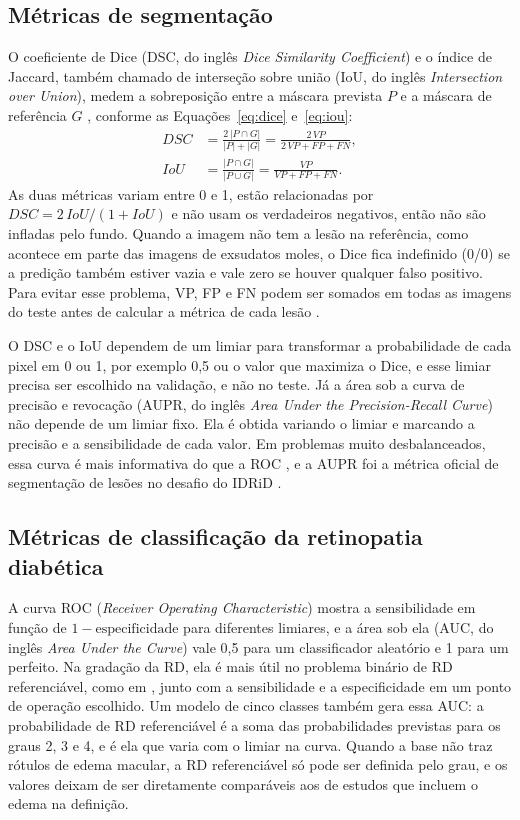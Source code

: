 \subsection{Métricas de segmentação}
\label{sec:ft-metricas-seg}

O coeficiente de Dice (DSC, do inglês \textit{Dice Similarity Coefficient}) e o índice de Jaccard, também chamado de interseção sobre união (IoU, do inglês \textit{Intersection over Union}), medem a sobreposição entre a máscara prevista $P$ e a máscara de referência $G$ \cite{taha2015metrics}, conforme as Equações~\ref{eq:dice} e~\ref{eq:iou}:
\begin{align}
	DSC &= \frac{2\,|P \cap G|}{|P| + |G|} = \frac{2\,VP}{2\,VP + FP + FN}, \label{eq:dice}\\
	IoU &= \frac{|P \cap G|}{|P \cup G|} = \frac{VP}{VP + FP + FN}. \label{eq:iou}
\end{align}
As duas métricas variam entre 0 e 1, estão relacionadas por $DSC = 2\,IoU/(1 + IoU)$ e não usam os verdadeiros negativos, então não são infladas pelo fundo. Quando a imagem não tem a lesão na referência, como acontece em parte das imagens de exsudatos moles, o Dice fica indefinido (0/0) se a predição também estiver vazia e vale zero se houver qualquer falso positivo. Para evitar esse problema, VP, FP e FN podem ser somados em todas as imagens do teste antes de calcular a métrica de cada lesão \cite{reinke2024pitfalls}.

O DSC e o IoU dependem de um limiar para transformar a probabilidade de cada pixel em 0 ou 1, por exemplo 0,5 ou o valor que maximiza o Dice, e esse limiar precisa ser escolhido na validação, e não no teste. Já a área sob a curva de precisão e revocação (AUPR, do inglês \textit{Area Under the Precision-Recall Curve}) não depende de um limiar fixo. Ela é obtida variando o limiar e marcando a precisão e a sensibilidade de cada valor. Em problemas muito desbalanceados, essa curva é mais informativa do que a ROC \cite{saito2015pr}, e a AUPR foi a métrica oficial de segmentação de lesões no desafio do IDRiD \cite{porwal2020idrid}.

\subsection{Métricas de classificação da retinopatia diabética}
\label{sec:ft-metricas-clf}

A curva ROC (\textit{Receiver Operating Characteristic}) mostra a sensibilidade em função de $1 - \text{especificidade}$ para diferentes limiares, e a área sob ela (AUC, do inglês \textit{Area Under the Curve}) vale 0,5 para um classificador aleatório e 1 para um perfeito. Na gradação da RD, ela é mais útil no problema binário de RD referenciável, como em , junto com a sensibilidade e a especificidade em um ponto de operação escolhido. Um modelo de cinco classes também gera essa AUC: a probabilidade de RD referenciável é a soma das probabilidades previstas para os graus 2, 3 e 4, e é ela que varia com o limiar na curva. Quando a base não traz rótulos de edema macular, a RD referenciável só pode ser definida pelo grau, e os valores deixam de ser diretamente comparáveis aos de estudos que incluem o edema na definição.

